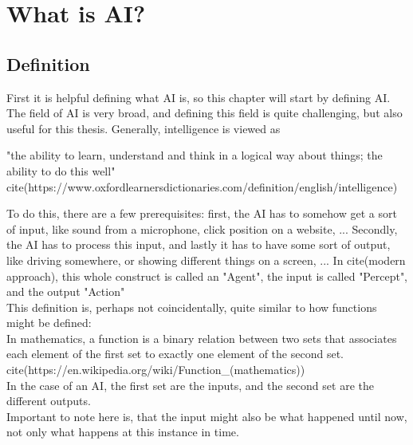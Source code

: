 \chapter{What is AI?}
\section{Definition}
First it is helpful defining what AI is, so this chapter will start by defining AI.
The field of AI is very broad, and defining this field is quite challenging, but also useful for this thesis. Generally, intelligence is viewed as 

"the ability to learn, understand and think in a logical way about things; the ability to do this well" cite(https://www.oxfordlearnersdictionaries.com/definition/english/intelligence)

To do this, there are a few prerequisites: first, the AI has to somehow get a sort of input, like sound from a microphone, click position on a website, ... 
Secondly, the AI has to process this input, 
and lastly it has to have some sort of output, like driving somewhere, or showing different things on a screen, ... 
In cite(modern approach), this whole construct is called an "Agent", the input is called "Percept", and the output "Action"\\This definition is, perhaps not coincidentally, quite similar to how functions might be defined: \\In mathematics, a function is a binary relation between two sets that associates each element of the first set to exactly one element of the second set. cite(https://en.wikipedia.org/wiki/Function_(mathematics)) \\In the case of an AI, the first set are the inputs, and the second set are the different outputs. \\Important to note here is, that the input might also be what happened until now, not only what happens at this instance in time.

